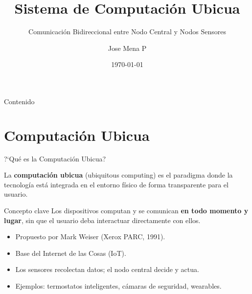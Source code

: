 \documentclass[aspectratio=169]{beamer}
\title{Sistema de Computaci\'on Ubicua}
\subtitle{Comunicaci\'on Bidireccional entre Nodo Central y Nodos Sensores}
\author{Jose Mena P}
\institute{Tecnolog\'ias Emergentes}
\date{\today}
\begin{document}
\begin{frame}
\titlepage
\end{frame}

\begin{frame}{Contenido}
\tableofcontents
\end{frame}

\section{Computaci\'on Ubicua}

\begin{frame}{?`Qu\'e es la Computaci\'on Ubicua?}

La \textbf{computaci\'on ubicua} (ubiquitous computing) es el paradigma donde la
tecnolog\'ia est\'a integrada en el entorno f\'isico de forma transparente para el usuario.

\vspace{0.5em}
\begin{block}{Concepto clave}
Los dispositivos computan y se comunican \textbf{en todo momento y lugar},
sin que el usuario deba interactuar directamente con ellos.
\end{block}

\vspace{0.5em}
\begin{itemize}
  \item Propuesto por Mark Weiser (Xerox PARC, 1991).
  \item Base del Internet de las Cosas (IoT).
  \item Los sensores recolectan datos; el nodo central decide y actua.
  \item Ejemplos: termostatos inteligentes, c\'amaras de seguridad, wearables.
\end{itemize}
\end{frame}
\end{document}
